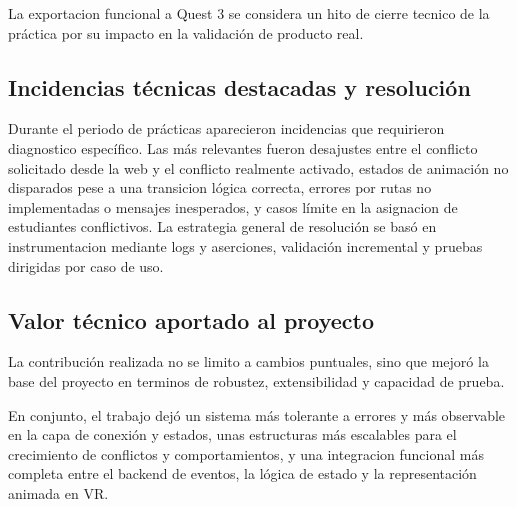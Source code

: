 La exportacion funcional a Quest 3 se considera un hito de cierre tecnico de la práctica por su impacto en la validación de producto real.\par

\subsection{Incidencias técnicas destacadas y resolución}
Durante el periodo de prácticas aparecieron incidencias que requirieron diagnostico específico. Las más relevantes fueron desajustes entre el conflicto solicitado desde la web y el conflicto realmente activado, estados de animación no disparados pese a una transicion lógica correcta, errores por rutas no implementadas o mensajes inesperados, y casos límite en la asignacion de estudiantes conflictivos. La estrategia general de resolución se basó en instrumentacion mediante logs y aserciones, validación incremental y pruebas dirigidas por caso de uso.

\subsection{Valor técnico aportado al proyecto}
La contribución realizada no se limito a cambios puntuales, sino que mejoró la base del proyecto en terminos de robustez, extensibilidad y capacidad de prueba.\par

En conjunto, el trabajo dejó un sistema más tolerante a errores y más observable en la capa de conexión y estados, unas estructuras más escalables para el crecimiento de conflictos y comportamientos, y una integracion funcional más completa entre el backend de eventos, la lógica de estado y la representación animada en VR.